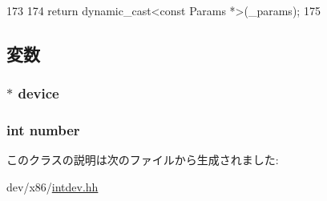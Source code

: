 \begin{DoxyCode}
173     {
174         return dynamic_cast<const Params *>(_params);
175     }
\end{DoxyCode}


\subsection{変数}
\hypertarget{classX86ISA_1_1IntSinkPin_a213401fbaf58b821f38f6e274ddafadc}{
\subsubsection[{device}]{$\ast$ {\bf device}}}
\label{classX86ISA_1_1IntSinkPin_a213401fbaf58b821f38f6e274ddafadc}
\hypertarget{classX86ISA_1_1IntSinkPin_a7106e2abc437ad981830d14176d15f09}{
\subsubsection[{number}]{\setlength{\rightskip}{0pt plus 5cm}int {\bf number}}}
\label{classX86ISA_1_1IntSinkPin_a7106e2abc437ad981830d14176d15f09}


このクラスの説明は次のファイルから生成されました:\begin{DoxyCompactItemize}
\item 
dev/x86/\hyperlink{intdev_8hh}{intdev.hh}\end{DoxyCompactItemize}
